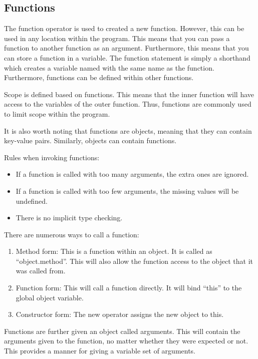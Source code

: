 		\subsection{Functions}
			The function operator is used to created a new function. 
			However, this can be used in any location within the program. 
			This means that you can pass a function to another function as an argument. 
			Furthermore, this means that you can store a function in a variable.
			The function statement is simply a shorthand which creates a variable named with the same name as the function. 
			Furthermore, functions can be defined within other functions. 

			Scope is defined based on functions. 
			This means that the inner function will have access to the variables of the outer function. 
			Thus, functions are commonly used to limit scope within the program. 

			It is also worth noting that functions are objects, meaning that they can contain key-value pairs. 
			Similarly, objects can contain functions. 

			Rules when invoking functions:
			\begin{itemize}
				\item If a function is called with too many arguments, the extra ones are ignored. 
				\item If a function is called with too few arguments, the missing values will be undefined. 
				\item There is no implicit type checking. 
			\end{itemize}
			
			There are numerous ways to call a function:
			\begin{enumerate}
				\item Method form: This is a function within an object. 
					It is called as ``object.method''. 
					This will also allow the function access to the object that it was called from. 
				\item Function form: This will call a function directly. 
					It will bind ``this'' to the global object variable. 
				\item Constructor form: The new operator assigns the new object to this. 
			\end{enumerate}

			Functions are further given an object called arguments. 
			This will contain the arguments given to the function, no matter whether they were expected or not. 
			This provides a manner for giving a variable set of arguments. 

